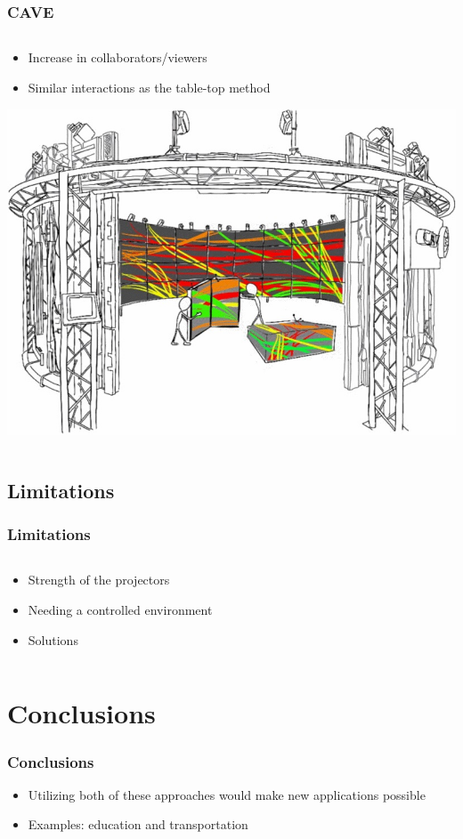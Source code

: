 \documentclass{beamer}
\begin{document}
\begin{frame}
\frametitle{CAVE}
\begin{columns}
    \begin{column}{0.7\textwidth}
    \begin{itemize}
		\item Increase in collaborators/viewers
		\item Similar interactions as the table-top method
	\end{itemize}
	\includegraphics[width=\textwidth]{../Sample_paper/images/CAVE}	
	\end{column}
    \end{columns}
\end{frame}

\subsection{Limitations}
\begin{frame}	
\frametitle{Limitations}
    \begin{columns}
    \begin{column}{.8\textwidth}
	\begin{itemize}
		\item Strength of the projectors 
		\item Needing a controlled environment 
		\item Solutions
	\end{itemize}
	\end{column}
	\end{columns}
\end{frame}

\section[Conclusions]{Conclusions}
\begin{frame}
\frametitle{Conclusions}
	\begin{itemize}
		\item Utilizing both of these approaches would make new applications possible
		\item Examples: education and transportation

	\end{itemize}
\end{frame}
\end{document}
